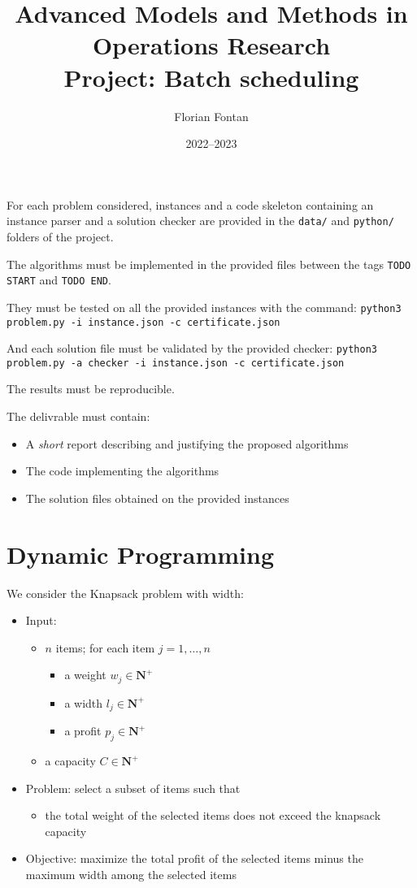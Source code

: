 \documentclass[a4paper,twocolumn]{article}
\author{Florian Fontan}
\title{Advanced Models and Methods in Operations Research \\ Project: Batch scheduling}
\date{2022--2023}
\newcommand{\N}{\mathbf{N}}
\begin{document}
\maketitle

For each problem considered, instances and a code skeleton containing an instance parser and a solution checker are provided in the \texttt{data/} and \texttt{python/} folders of the project.

The algorithms must be implemented in the provided files between the tags \texttt{TODO START} and \texttt{TODO END}.

They must be tested on all the provided instances with the command:
\texttt{python3 problem.py -i instance.json -c certificate.json}

And each solution file must be validated by the provided checker:
\texttt{python3 problem.py -a checker -i instance.json -c certificate.json}

The results must be reproducible.

\bigskip

The delivrable must contain:
\begin{itemize}
  \item A \emph{short} report describing and justifying the proposed algorithms
  \item The code implementing the algorithms
  \item The solution files obtained on the provided instances
\end{itemize}

\section{Dynamic Programming}

We consider the Knapsack problem with width:
\begin{itemize}
  \item Input:
    \begin{itemize}
      \item $n$ items; for each item $j = 1, \dots, n$
        \begin{itemize}
          \item a weight $w_j \in \N^+$
          \item a width $l_j \in \N^+$
          \item a profit $p_j \in \N^+$
        \end{itemize}
      \item a capacity $C \in \N^+$
    \end{itemize}
  \item Problem: select a subset of items such that
    \begin{itemize}
      \item the total weight of the selected items does not exceed the knapsack capacity
    \end{itemize}
  \item Objective: maximize the total profit of the selected items minus the maximum width among the selected items
\end{itemize}
\end{document}
